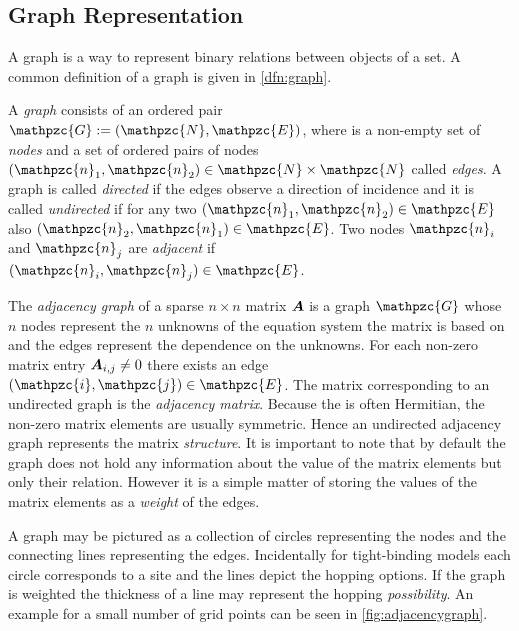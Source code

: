 \subsection{Graph Representation}
A graph is a way to represent binary relations between objects of a set. A common definition of a graph is given in \cref{dfn:graph}.
\begin{dfn}\label{dfn:graph}
A \emph{graph}  consists of an ordered pair $\mathpzc{G} :=(\mathpzc{N},\mathpzc{E})$, where  is a non-empty set of \emph{nodes}  and  a set of ordered pairs of nodes $(\mathpzc{n}_1,\mathpzc{n}_2) \in \mathpzc{N} \times \mathpzc{N}$ called \emph{edges}.
A graph is called \emph{directed} if the edges observe a direction of incidence  and it is called \emph{undirected} if for any two $(\mathpzc{n}_1,\mathpzc{n}_2) \in \mathpzc{E}$ also $(\mathpzc{n}_2,\mathpzc{n}_1) \in \mathpzc{E}$.
Two nodes $\mathpzc{n}_i$ and $\mathpzc{n}_j$ are \emph{adjacent} if $(\mathpzc{n}_i,\mathpzc{n}_j) \in \mathpzc{E}$. \cite{graham1995handbook}
\end{dfn}
The \emph{adjacency graph} of a sparse $n \times n$ matrix $\boldsymbol{A}$ is a graph $\mathpzc{G}$ whose $n$ nodes represent the $n$ unknowns of the equation system the matrix is based on and the edges represent the dependence on the unknowns. For each non-zero matrix entry $\boldsymbol{A}_{i,j}\neq 0$ there exists an edge $(\mathpzc{i},\mathpzc{j}) \in \mathpzc{E}$. The matrix corresponding to an undirected graph is the \emph{adjacency matrix}. Because the \hamil{} is often Hermitian, the non-zero matrix elements are usually symmetric. Hence an undirected adjacency graph represents the matrix \emph{structure}. It is important to note that by default the graph does not hold any information about the value of the matrix elements but only their relation. However it is a simple matter of storing the values of the matrix elements as a \emph{weight} of the edges.\par
A graph may be pictured as a collection of circles representing the nodes and the connecting lines representing the edges. Incidentally for tight-binding models each circle corresponds to a site and the lines depict the hopping options. If the graph is weighted the thickness of a line may represent the hopping \emph{possibility}. An example for a small number of grid points can be seen in \cref{fig:adjacencygraph}.

